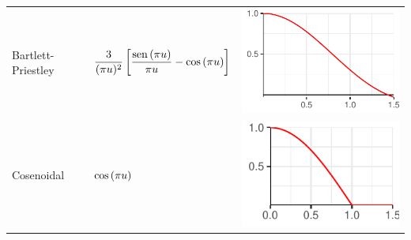 \begin{SidewaysTable}
\begin{tabular*}{\textwidth}{lll}
\rowcolor{gris}
Bartlett-Priestley &
$\displaystyle 
\frac{3}{(\pi u)^{2}} \left[ \frac{\mathrm{sen}\left( \pi u \right)}{\pi u} - \mathrm{cos}\left( \pi u \right) \right]
$
& \includegraphics[scale=.4]{./img_ventanas/ventana_bartlet_priestley.pdf} \\
Cosenoidal &
$\displaystyle 
\mathrm{cos}\left( \pi u \right)
$
& \includegraphics[scale=.4]{./img_ventanas/ventana_cosenoidal.pdf} \\
\bottomrule
\end{tabular*}
\label{ventanas}
\end{SidewaysTable}

